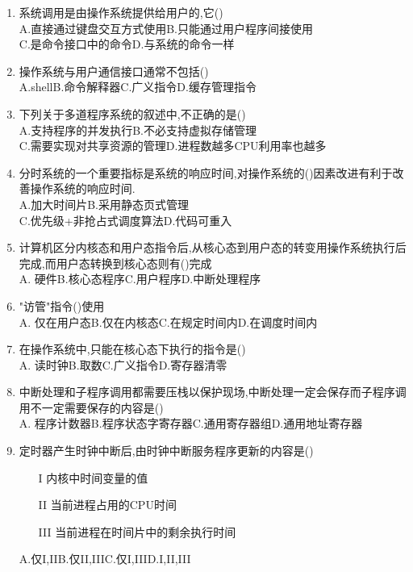 \documentclass[12pt, a4paper, oneside, UTF8]{ctexbook}
\begin{document}
\begin{enumerate}
    \item 系统调用是由操作系统提供给用户的,它() \\
    A.直接通过键盘交互方式使用\qquad B.只能通过用户程序间接使用 \\
    C.是命令接口中的命令\qquad D.与系统的命令一样
    
    \item 操作系统与用户通信接口通常不包括() \\
    A.shell\qquad B.命令解释器\qquad C.广义指令\qquad D.缓存管理指令 

    \item 下列关于多道程序系统的叙述中,不正确的是() \\
    A.支持程序的并发执行\qquad B.不必支持虚拟存储管理 \\
    C.需要实现对共享资源的管理\qquad D.进程数越多CPU利用率也越多 

    \item 分时系统的一个重要指标是系统的响应时间,对操作系统的()因素改进有利于改善操作系统的响应时间. \\
    A.加大时间片\qquad B.采用静态页式管理 \\
    C.优先级+非抢占式调度算法\qquad D.代码可重入 

    \item 计算机区分内核态和用户态指令后,从核心态到用户态的转变用操作系统执行后完成,而用户态转换到核心态则有()完成 \\
    A. 硬件\qquad B.核心态程序\qquad C.用户程序\qquad D.中断处理程序

    \item "访管"指令()使用 \\
    A. 仅在用户态\qquad B.仅在内核态\qquad C.在规定时间内\qquad D.在调度时间内

    \item 在操作系统中,只能在核心态下执行的指令是() \\
    A. 读时钟\qquad B.取数\qquad C.广义指令\qquad D.寄存器清零

    \item \bt\bl 中断处理和子程序调用都需要压栈以保护现场,中断处理一定会保存而子程序调用不一定需要保存的内容是() \\
    A. 程序计数器\qquad B.程序状态字寄存器\qquad C.通用寄存器组\qquad D.通用地址寄存器

    \item \bt 定时器产生时钟中断后,由时钟中断服务程序更新的内容是()
    \begin{enumerate}
        \item [I] 内核中时间变量的值
        \item [II] 当前进程占用的CPU时间
        \item [III] 当前进程在时间片中的剩余执行时间
    \end{enumerate}
    A.仅I,II\qquad B.仅II,III\qquad C.仅I,III\qquad D.I,II,III


\end{enumerate}
\end{document}
